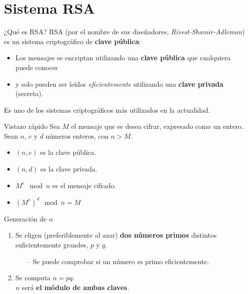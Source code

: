 \documentclass[10pt]{beamer} %
\begin{document}
\section{Sistema RSA}
\begin{frame}{¿Qué es RSA?}
RSA (por el nombre de sus diseñadores, \textit{Rivest-Shamir-Adleman}) es un sistema criptográfico de \textbf{clave pública}:
\begin{itemize}
    \item Los mensajes se encriptan utilizando una \textbf{clave pública} que cualquiera puede conocer
    \item y solo pueden ser leídos \textit{eficientemente} utilizando una \textbf{clave privada} (secreta).
\end{itemize}
Es uno de los sistemas criptográficos más utilizados en la actualidad.
\end{frame}
\begin{frame}{Vistazo rápido}
Sea $M$ el mensaje que se desea cifrar, expresado como un entero.\\
Sean $n$, $e$ y $d$ números enteros, con $n > M$.
\begin{itemize}
    \item $(n, e)$ es la clave pública.
    \item $(n, d)$ es la clave privada.
    \item $M^e \mod n$ es el mensaje cifrado.
    \item $(M^e)^d \mod n = M$
\end{itemize}
\end{frame}
\begin{frame}{Generación de $n$}
\begin{enumerate}
    \item Se eligen (preferiblemente al azar) \textbf{dos números primos} distintos suficientemente grandes, $p$ y $q$.
    \begin{itemize}
        \item[--] Se puede comprobar si un número es primo eficientemente.
    \end{itemize}
    \item Se computa $n = pq$.\\ $n$ será \textbf{el módulo de ambas claves}.
\end{enumerate}
\end{frame}
\end{document}
